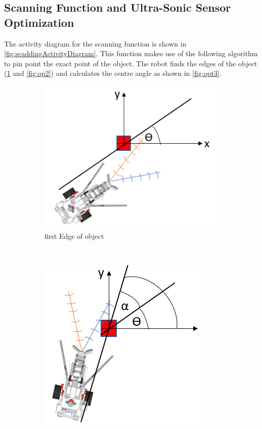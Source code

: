 \subsection{Scanning Function and Ultra-Sonic Sensor Optimization}
\noindent The activity diagram for the scanning function is shown in \vref{fig:scaddingActivityDiagram}. This function makes use of the following algorithm to pin point the exact point of the object. The robot finds the edges of the object (\cref{fig:opt1} and \cref{fig:op2}) and calculates the centre angle as shown in \cref{fig:opt3}.
\begin{figure}[!ht]
	\centering
	\begin{subfigure}[b]{0.3\textwidth}
		\centering
		\includegraphics[width=\textwidth]{Graphics/opt1}
		\caption{first Edge of object}
		\label{fig:opt1}
	\end{subfigure}
	~
	\begin{subfigure}[b]{0.3\textwidth}
		\centering
		\includegraphics[width=\textwidth]{Graphics/opt2}

\end{subfigure}
\end{figure}
